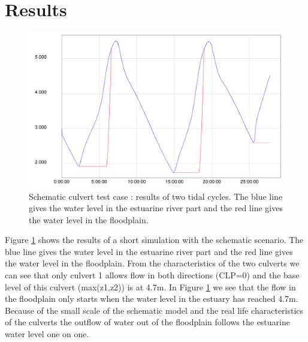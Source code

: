 \section{Results}

\begin{figure}[h]
\begin{center}
	\includegraphics[scale=0.14]{img/figure2.png}
\end{center}
\caption{Schematic culvert test case : results of two tidal cycles.
The blue line gives the water level in the estuarine river part and the red line gives the water level in the floodplain.}
\label{fig:culvert_figure2}
\end{figure}

Figure \ref{fig:culvert_figure2} shows the results of a short simulation with the schematic scenario.
The blue line gives the water level in the estuarine river part and the red line gives the water level in the floodplain.
From the characteristics of the two culverts we can see that only culvert 1 allows flow in both directions (CLP=0)
and the base level of this culvert (max(z1,z2)) is at 4.7m.
In Figure \ref{fig:culvert_figure2} we see that the flow in the floodplain only starts when the water level in the estuary has reached 4.7m.
Because of the small scale of the schematic model and the real life characteristics of the culverts the outflow
of water out of the floodplain follows the estuarine water level one on one.

